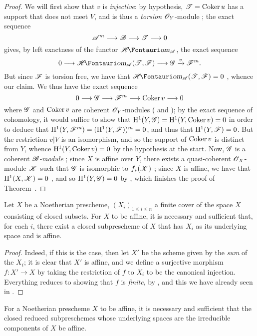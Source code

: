 \begin{proof}
We will first show that $v$ is \emph{injective}:
by hypothesis, $\mathscr{T}=\operatorname{Coker} u$ has a support that does not meet $V$, and is thus a \emph{torsion} $\mathscr{O}_Y$-module ;
the exact sequence
\[
  \sh{A}^m\to\sh{B}\to\sh{T}\to0
\]
gives, by left exactness of the functor $\shHom_{\sh{A}}$, the exact sequence
\[
  0\to\shHom_{\sh{A}}(\sh{T},\sh{F})\to\sh{G}\xrightarrow{v}\sh{F}^m.
\]
But since $\mathscr{F}$ is torsion free, we have that $\shHom_{\sh{A}}(\sh{T},\sh{F})=0$ , whence our claim.
We thus have the exact sequence
\[
  0\to\sh{G}\to\sh{F}^m\to\Coker v\to0
\]
where $\mathscr{G}$ and $\operatorname{Coker} v$ are coherent $\mathscr{O}_Y$-modules ( and );
by the exact sequence of cohomology, it would suffice to show that $\mathrm{H}^1(Y,\mathscr{G})=\mathrm{H}^1(Y,\operatorname{Coker} v)=0$ in order to deduce that $\mathrm{H}^1(Y,\mathscr{F}^m)=(\mathrm{H}^1(Y,\mathscr{F}))^m=0$, and thus that $\mathrm{H}^1(Y,\mathscr{F})=0$.
But the restriction $v|V$ is an isomorphism, and so the support of $\operatorname{Coker} v$ is distinct from $Y$, whence $\mathrm{H}^1(Y,\operatorname{Coker} v)=0$ by the hypothesis at the start.
Now, $\mathscr{G}$ is a coherent \emph{$\mathscr{B}$-module} ;
since $X$ is affine over $Y$, there exists a quasi-coherent $\mathscr{O}_X$-module $\mathscr{K}$ such that $\mathscr{G}$ is isomorphic to $f_*(\mathscr{K})$ ;
since $X$ is affine, we have that $\mathrm{H}^1(X,\mathscr{K})=0$ , and so $\mathrm{H}^1(Y,\mathscr{G})=0$ by , which finishes the proof of Theorem~.
\end{proof}

\begin{corollary}[6.7.2]
\label{II.6.7.2}
Let $X$ be a Noetherian prescheme, $(X_i)_{1\leq i\leq n}$ a finite cover of the space $X$ consisting of closed subsets.
For $X$ to be affine, it is necessary and sufficient that, for each $i$, there exist a closed subprescheme of $X$ that has $X_i$ as its underlying space and is affine.
\end{corollary}

\begin{proof}
Indeed, if this is the case, then let $X'$ be the scheme given by the \emph{sum} of the $X_i$;
it is clear that $X'$ is affine, and we define a surjective morphism $f:X'\to X$ by taking the restriction of $f$ to $X_i$ to be the canonical injection.
Everything reduces to showing that $f$ is \emph{finite}, by , and this we have already seen in .
\end{proof}

\begin{corollary}[6.7.3]
\label{II.6.7.3}
For a Noetherian prescheme $X$ to be affine, it is necessary and sufficient that the closed reduced subpreschemes whose underlying spaces are the irreducible components of $X$ be affine.
\end{corollary}
